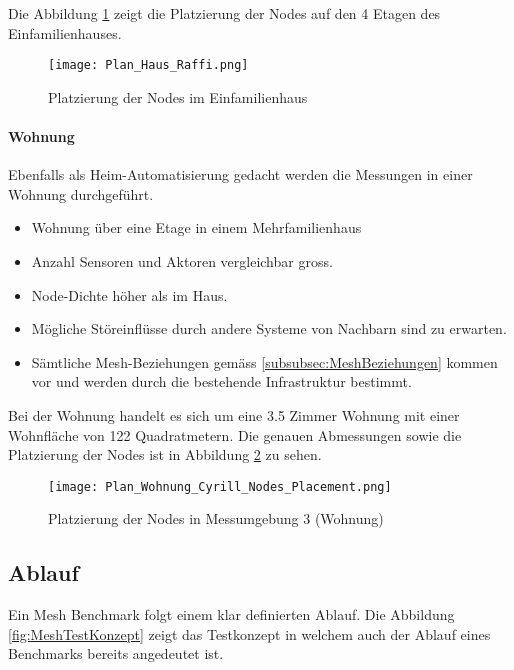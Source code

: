 Die Abbildung \ref{fig:Messumgebung2Einfamilienhaus} zeigt die Platzierung der Nodes auf den 4 Etagen des Einfamilienhauses.

\begin{figure}[H]
	\centering
	\texttt{[image: Plan\_Haus\_Raffi.png]}
	\caption{Platzierung der Nodes im Einfamilienhaus}\label{fig:Messumgebung2Einfamilienhaus}
\end{figure}
	
\paragraph{Wohnung}
Ebenfalls als Heim-Automatisierung gedacht werden die Messungen in einer Wohnung durchgeführt.
\begin{itemize}
	\item Wohnung über eine Etage in einem Mehrfamilienhaus
	\item Anzahl Sensoren und Aktoren vergleichbar gross.
	\item Node-Dichte höher als im Haus.
	\item Mögliche Störeinflüsse durch andere Systeme von Nachbarn sind zu erwarten.
	\item Sämtliche Mesh-Beziehungen gemäss \ref{subsubsec:MeshBeziehungen} kommen vor und werden durch die bestehende Infrastruktur bestimmt.
\end{itemize}

Bei der Wohnung handelt es sich um eine 3.5 Zimmer Wohnung mit einer Wohnfläche von 122 Quadratmetern. Die genauen Abmessungen sowie die Platzierung der Nodes ist in Abbildung \ref{fig:PlatzierungderNodesinMessumgebung3} zu sehen.

\begin{figure}[H]
	\centering
	\texttt{[image: Plan\_Wohnung\_Cyrill\_Nodes\_Placement.png]}
	\caption{Platzierung der Nodes in Messumgebung 3 (Wohnung)}\label{fig:PlatzierungderNodesinMessumgebung3}
\end{figure}




\subsection{Ablauf}\label{subsec:AblaufMesh}

Ein Mesh Benchmark folgt einem klar definierten Ablauf. Die Abbildung \ref{fig:MeshTestKonzept} zeigt das Testkonzept in welchem auch der Ablauf eines Benchmarks bereits angedeutet ist.

